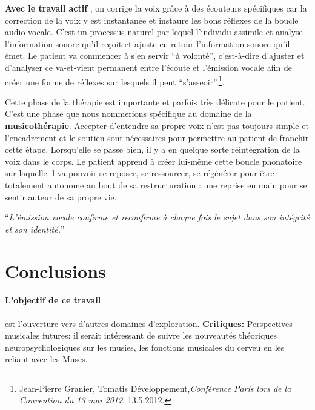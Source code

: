 \textbf{Avec le travail actif }, on corrige la voix grâce à des écouteurs spécifiques 
car la correction de la voix y est instantanée et instaure les bons
réflexes de la boucle audio-vocale. C'est un processus naturel par
lequel l'individu assimile et analyse l'information sonore qu'il reçoit
et ajuste en retour l'information sonore qu'il émet. Le patient va
commencer à s'en servir ``à volonté'', c'est-à-dire d'ajuster et
d'analyser ce va-et-vient permanent entre l'écoute et l'émission vocale
afin de créer une forme de réflexes sur lesquels il peut ``s'asseoir''.\footnote{Jean-Pierre Granier, Tomatis 
Développement,\emph{Conférence Paris lors de la Convention du 13 mai 2012}, 13.5.2012.}.

Cette phase de la thérapie est importante et parfois très délicate
pour le patient. C'est une phase que nous nommerions spécifique au domaine de 
la \textbf{musicothérapie}.  Accepter d'entendre sa propre voix n'est pas toujours
simple et l'encadrement et le soutien sont nécessaires pour permettre
au patient de franchir cette étape. Lorsqu'elle se passe bien, il
y a en quelque sorte réintégration de la voix dans le corps. Le patient
apprend à créer lui-même cette boucle phonatoire sur laquelle il va
pouvoir se reposer, se ressourcer, se régénérer pour être totalement
autonome au bout de sa restructuration : une reprise en main pour se sentir auteur de sa propre vie. 

\enquote{\emph{L'émission vocale confirme et reconfirme à chaque
fois le sujet dans son intégrité et son identité.}}%
\autocite[Tomatis en fait une description précise dans la troisième partie de
son livre, pp. 185--301]{tomatis:loreille}

\section{Conclusions}

\label{Conclusions}

\paragraph{L'objectif de ce travail} est l'ouverture vers d'autres
domaines d'exploration.
\textbf{Critiques:}
Perspectives musicales futures: il serait intéressant de suivre les
nouveautés théoriques neuropsychologiques sur les musies, les
fonctions musicales du cerveu en les reliant avec les Muses.


